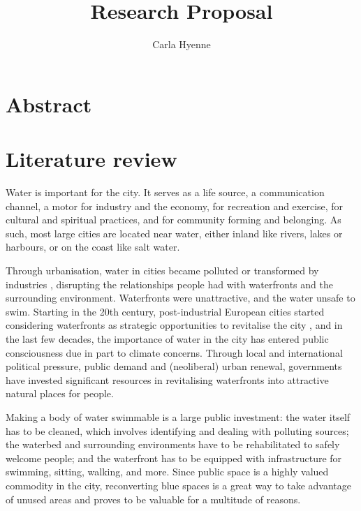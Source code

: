 \documentclass{article}
\title{Research Proposal}
\author{Carla Hyenne}
\date{}
\begin{document}
\maketitle

\tableofcontents 


\section{Abstract}


\pagebreak
\section{Literature review}

Water is important for the city. It serves as a life source, a communication channel, a motor for industry and the economy, for recreation and exercise, for cultural and spiritual practices, and for community forming and belonging. As such, most large cities are located near water, either inland like rivers, lakes or harbours, or on the coast like salt water.

Through urbanisation, water in cities became polluted or transformed by industries \parencite{kampa_langaas_anzaldua_2016}, disrupting the relationships people had with waterfronts and the surrounding environment. Waterfronts were unattractive, and the water unsafe to swim.
Starting in the 20th century, post-industrial European cities started considering waterfronts as strategic opportunities to revitalise the city \parencite{del2021dismantling}, and in the last few decades, the importance of water in the city has entered public consciousness due in part to climate concerns.
Through local and international political pressure, public demand and (neoliberal) urban renewal, governments have invested significant resources in revitalising waterfronts into attractive natural places for people. 

Making a body of water swimmable is a large public investment: the water itself has to be cleaned, which involves identifying and dealing with polluting sources; the waterbed and surrounding environments have to be rehabilitated to safely welcome people; and the waterfront has to be equipped with infrastructure for swimming, sitting, walking, and more. Since public space is a highly valued commodity in the city, reconverting blue spaces is a great way to take advantage of unused areas and proves to be valuable for a multitude of reasons. 
\end{document}
